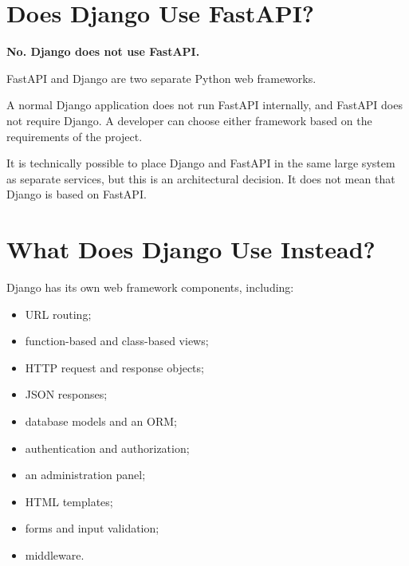 \documentclass[a4paper]{article}
\begin{document}
    
    \section*{Does Django Use FastAPI?}
        
        \begin{tcolorbox}[
            colback=rowgray,
            colframe=headerblue,
            boxrule=0.7pt,
            arc=2pt,
            breakable
        ]
            \centering
            \Large\textbf{No. Django does not use FastAPI.}
        \end{tcolorbox}
        
        FastAPI and Django are two separate Python web frameworks.
        
        A normal Django application does not run FastAPI internally, and FastAPI
        does not require Django. A developer can choose either framework based
        on the requirements of the project.
        
        It is technically possible to place Django and FastAPI in the same large
        system as separate services, but this is an architectural decision. It
        does not mean that Django is based on FastAPI.
    
    
    \section*{What Does Django Use Instead?}
        
        Django has its own web framework components, including:
        
        \begin{itemize}
            \item URL routing;
            \item function-based and class-based views;
            \item HTTP request and response objects;
            \item JSON responses;
            \item database models and an ORM;
            \item authentication and authorization;
            \item an administration panel;
            \item HTML templates;
            \item forms and input validation;
            \item middleware.
        \end{itemize}
        
\end{document}
